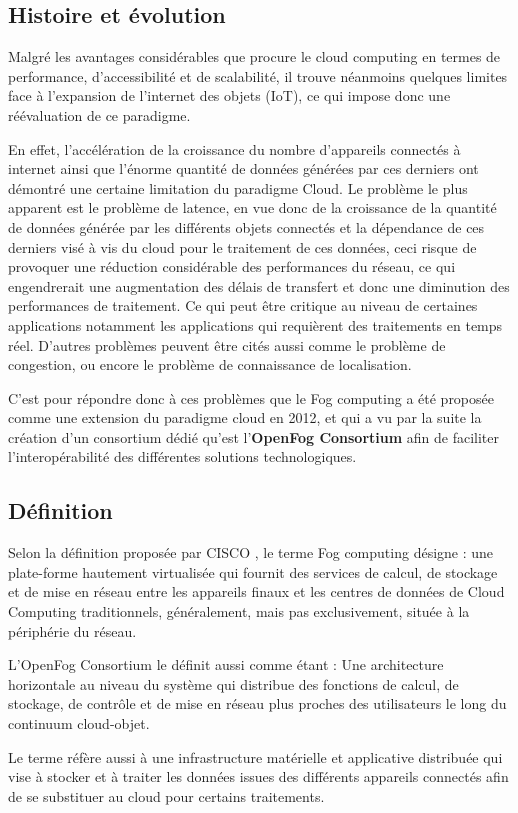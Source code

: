 \subsection{Histoire et évolution}
Malgré les avantages considérables que procure le cloud computing en termes de performance, d’accessibilité et de scalabilité, il trouve néanmoins quelques limites face à l'expansion de l’internet des objets (IoT), ce qui impose donc une réévaluation de ce paradigme. \par 
En effet, l’accélération de la croissance du nombre d'appareils connectés à internet ainsi que l’énorme quantité de données générées par ces derniers ont démontré une certaine limitation du paradigme Cloud. Le problème le plus apparent est le problème de latence, en vue donc de la croissance de la quantité de données générée par les différents objets connectés et la dépendance de ces derniers visé à vis du cloud pour le traitement de ces données, ceci risque de provoquer une réduction considérable des performances du réseau, ce qui engendrerait une augmentation des délais de transfert et donc une diminution des performances de traitement. Ce qui peut être critique au niveau de certaines applications notamment les applications qui requièrent des traitements en temps réel. D'autres problèmes peuvent être cités aussi comme le problème de congestion, ou encore le problème de connaissance de localisation. \par
C’est pour répondre donc à ces problèmes que le Fog computing a été proposée comme une extension du paradigme cloud en 2012, et qui a vu par la suite la création d'un consortium dédié qu'est l'\textbf{OpenFog Consortium} afin de faciliter l'interopérabilité des différentes solutions technologiques.
\subsection{Définition}
Selon la définition proposée par CISCO \cite{bonomi2012}, le terme Fog computing désigne : \og{}une plate-forme hautement virtualisée qui fournit des services de calcul, de stockage et de mise en réseau entre les appareils finaux et les centres de données de Cloud Computing traditionnels, généralement, mais pas exclusivement, située à la périphérie du réseau\fg{}.\par
L'OpenFog Consortium \cite{OpenFog2017} le définit aussi comme étant : \og{} Une architecture horizontale au niveau du système qui distribue des fonctions de calcul, de stockage, de contrôle et de mise en réseau plus proches des utilisateurs le long du continuum cloud-objet\fg{}.\par
Le terme réfère aussi à une infrastructure matérielle et applicative distribuée qui vise à stocker et à traiter les données issues des différents appareils connectés afin de se substituer au cloud pour certains traitements.
